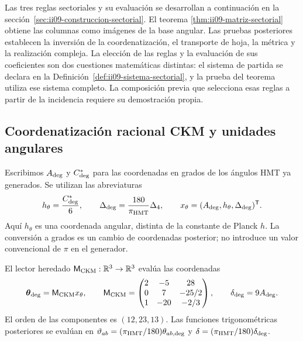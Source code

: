 \begin{remark}
Las tres reglas sectoriales y su evaluación se desarrollan a continuación
en la sección~\ref{sec:ii09-construccion-sectorial}. El teorema
\ref{thm:ii09-matriz-sectorial} obtiene las columnas como imágenes de la
base angular. Las pruebas posteriores establecen la inversión de la coordenatización,
el transporte de hoja, la métrica y la realización compleja.
La elección de las reglas y la evaluación de sus coeficientes son dos
cuestiones matemáticas distintas: el sistema de partida se declara en la
Definición~\ref{def:ii09-sistema-sectorial}, y la prueba del teorema
utiliza ese sistema completo. La composición previa que selecciona esas
reglas a partir de la incidencia requiere su demostración propia.
\end{remark}



\subsection{Coordenatización racional CKM y unidades angulares}

Escribimos \(A_{\rm deg}\) y \(C^*_{\rm deg}\) para las coordenadas en
grados de los ángulos HMT ya generados. Se utilizan las abreviaturas
\begin{equation}
 h_\theta=\frac{C^*_{\rm deg}}6,
 \qquad
 \Delta_{\rm deg}=\frac{180}{\pi_{\rm HMT}}\Delta_4,
 \qquad
 x_\theta=(A_{\rm deg},h_\theta,\Delta_{\rm deg})^{\mathsf T}.
 \label{eq:ii-angular-chart}
\end{equation}
Aquí \(h_\theta\) es una coordenada angular, distinta de la constante de
Planck \(h\). La conversión a grados es un cambio de coordenadas posterior; no
introduce un valor convencional de \(\pi\) en el generador.

\begin{definition}
El lector heredado \(\mathsf M_{\rm CKM}:\mathbb R^3\to\mathbb R^3\)
evalúa las coordenadas
\begin{equation}
 \boldsymbol\theta_{\rm deg}=\mathsf M_{\rm CKM}x_\theta,
 \qquad
 \mathsf M_{\rm CKM}=
 \begin{pmatrix}
 2&-5&28\\
 0&7&-25/2\\
 1&-20&-2/3
 \end{pmatrix},
 \qquad
 \delta_{\rm deg}=9A_{\rm deg}.
 \label{eq:ii-ckm-map}
\end{equation}
El orden de las componentes es \((12,23,13)\). Las funciones
trigonométricas posteriores se evalúan en
\(\vartheta_{ab}=(\pi_{\rm HMT}/180)\theta_{ab,\rm deg}\) y
\(\delta=(\pi_{\rm HMT}/180)\delta_{\rm deg}\).
\end{definition}

